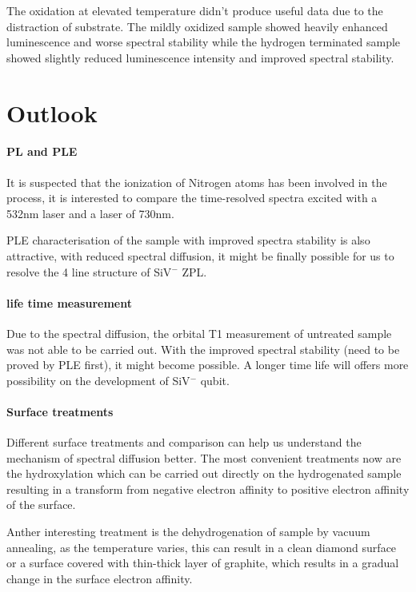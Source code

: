 The oxidation at elevated temperature didn't produce useful data due to the distraction of substrate. The mildly oxidized sample showed heavily enhanced luminescence and worse spectral stability while the hydrogen terminated sample showed slightly reduced luminescence intensity and improved spectral stability.

\section{ Outlook}

\paragraph{PL and PLE}
It is suspected that the ionization of Nitrogen atoms has been involved in the process, it is interested to compare the time-resolved spectra excited with a 532nm laser and a laser of 730nm.

PLE characterisation of the sample with improved spectra stability is also attractive, with reduced spectral diffusion, it might be finally possible for us to resolve the 4 line structure of SiV$^{-}$ ZPL.

\paragraph{life time measurement}
Due to the spectral diffusion, the orbital T1 measurement of untreated sample was not able to be carried out. With the improved spectral stability (need to be proved by PLE first), it might become possible. A longer time life will offers more possibility on the development of SiV$^{-}$ qubit.

\paragraph{Surface treatments}

Different surface treatments and comparison can help us understand the mechanism of spectral diffusion better. The most convenient treatments now are the hydroxylation which can be carried out directly on the hydrogenated sample resulting in a transform from negative electron affinity to positive electron affinity of the surface.

Anther interesting treatment is the dehydrogenation of sample by vacuum annealing, as the temperature varies, this can result in a clean diamond surface or a surface covered with thin-thick layer of graphite, which results in a gradual change in the surface electron affinity. \citep{diederich_electron_1998,maier_electron_2001}

